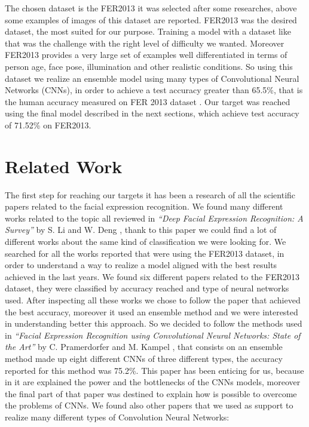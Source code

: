 \documentclass[10pt,twocolumn,letterpaper]{article}
\begin{document}
The chosen dataset is the FER2013 it was selected after some researches, above some examples of images of this dataset are reported.
FER2013 was the desired dataset, the most suited for our purpose. Training a model with a dataset like that was the challenge
with the right level of difficulty we wanted.
Moreover FER2013 provides a very large set of examples well differentiated in terms of person age, face pose, illumination and other realistic conditions.
So using this dataset we realize an ensemble model using many types of Convolutional Neural Networks (CNNs), in order to achieve a test accuracy
greater than 65.5\%, that is the human accuracy measured on FER 2013 dataset \cite{3}. Our target was reached using the final model described in the next
sections, which achieve test accuracy of 71.52\% on FER2013.

\section{Related Work}
The first step for reaching our targets it has been a research of all the scientific papers related to the facial expression recognition.
We found many different works related to the topic all reviewed in \textit{``Deep Facial Expression Recognition: A Survey''} by S. Li and W. Deng \cite{paper}, thank to this paper
we could find a lot of different works about the same kind of classification we were looking for.
We searched for all the works reported that were using the FER2013 dataset, in order to understand a way to realize a model aligned with the best results achieved in the last years.
We found six different papers related to the FER2013 dataset, they were classified by accuracy reached and type of neural networks used.
After inspecting all these works we chose to follow the paper that achieved the best accuracy, moreover it used an ensemble method and we were interested in understanding better this approach.
So we decided to follow the methods used in \textit{``Facial Expression Recognition using
   Convolutional Neural Networks: State of the Art''} by C. Pramerdorfer and M. Kampel \cite{147}, that consists on an ensemble method made up eight different CNNs of three different types, the accuracy reported for this method was 75.2\%.
This paper has been enticing for us, because in it are explained the power and the bottlenecks of the CNNs
models, moreover the final part of that paper was destined to explain how is possible to overcome the problems of CNNs.
We found also other papers that we used as support to realize many different types of Convolution Neural Networks:
\end{document}
